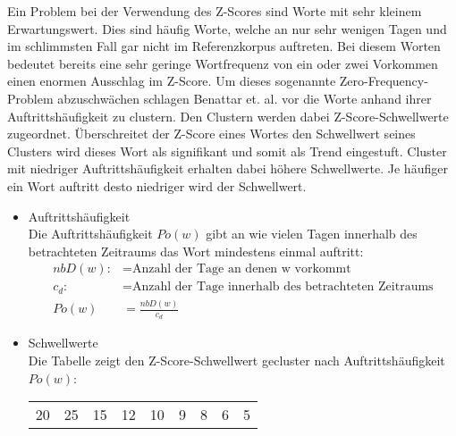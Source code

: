 Ein Problem bei der Verwendung des Z-Scores sind Worte mit sehr kleinem Erwartungswert. Dies sind häufig Worte, welche an nur sehr wenigen Tagen und im schlimmsten Fall gar nicht im Referenzkorpus auftreten. Bei diesem Worten bedeutet bereits eine sehr geringe Wortfrequenz von ein oder zwei Vorkommen einen enormen Ausschlag im Z-Score. Um dieses sogenannte Zero-Frequency-Problem abzuschwächen schlagen Benattar et. al. vor die Worte anhand ihrer Auftrittshäufigkeit zu clustern. Den Clustern werden dabei Z-Score-Schwellwerte zugeordnet. Überschreitet der Z-Score eines Wortes den Schwellwert seines Clusters wird dieses Wort als signifikant und somit als Trend eingestuft. Cluster mit niedriger Auftrittshäufigkeit erhalten dabei höhere Schwellwerte. Je häufiger ein Wort auftritt desto niedriger wird der Schwellwert. 

\begin{itemize}
	
	\item{Auftrittshäufigkeit}\\
		Die Auftrittshäufigkeit $Po(w)$ gibt an wie vielen Tagen innerhalb des betrachteten Zeitraums das Wort mindestens einmal auftritt:
		\begin{align*}
		 	nbD(w) :&= \text{Anzahl der Tage an denen w vorkommt} \\
			c_d	   :&= \text{Anzahl der Tage innerhalb des betrachteten Zeitraums}\\
			  Po(w) &=\frac{nbD(w)}{c_d}
		\end{align*}

	\item{Schwellwerte}\\
		Die Tabelle zeigt den Z-Score-Schwellwert gecluster nach Auftrittshäufigkeit $Po(w)$:\\
		\begin{tabular}{|c|c|c|c|c|c|c|c|c|}
			\hline
			[0-5[ & [5-10[ & [10-20[ & [20-30[ & [30-50[ & [50-60[ & [60-70[ & [70-80[ & [80-100] \\
			\hline
			20 & 25 & 15 & 12 & 10 & 9 & 8 & 6 & 5 \\
			\hline
		\end{tabular}
			
\end{itemize}